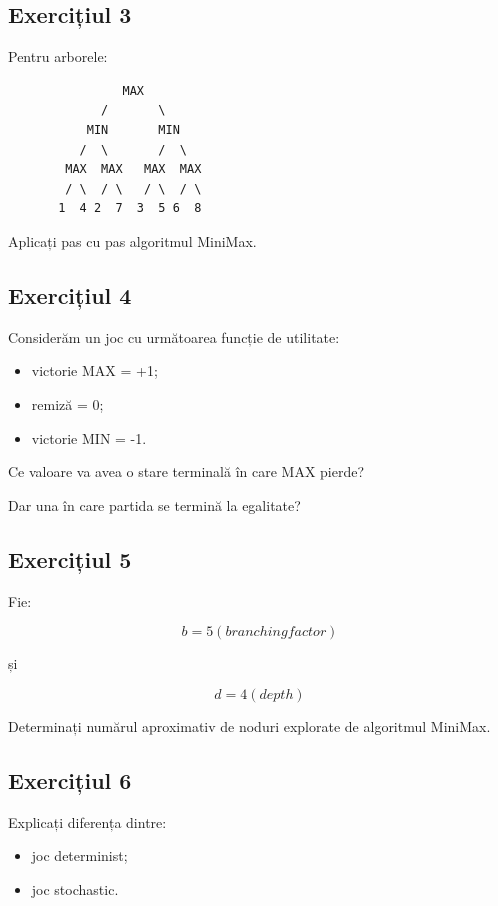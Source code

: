 \documentclass[12pt,a4paper]{article}
\begin{document}
\subsection{Exercițiul 3}

Pentru arborele:

\begin{verbatim}
                MAX
             /       \
           MIN       MIN
          /  \       /  \
        MAX  MAX   MAX  MAX
        / \  / \   / \  / \
       1  4 2  7  3  5 6  8
\end{verbatim}

Aplicați pas cu pas algoritmul MiniMax.

\subsection{Exercițiul 4}

Considerăm un joc cu următoarea funcție de utilitate:

\begin{itemize}
\item victorie MAX = +1;
\item remiză = 0;
\item victorie MIN = -1.
\end{itemize}

Ce valoare va avea o stare terminală în care MAX pierde?

Dar una în care partida se termină la egalitate?

\subsection{Exercițiul 5}

Fie:

\[
b = 5 (branching factor)
\]

și

\[
d = 4 (depth)
\]

Determinați numărul aproximativ de noduri explorate de algoritmul MiniMax.

\subsection{Exercițiul 6}

Explicați diferența dintre:

\begin{itemize}
\item joc determinist;
\item joc stochastic.
\end{itemize}
\end{document}

